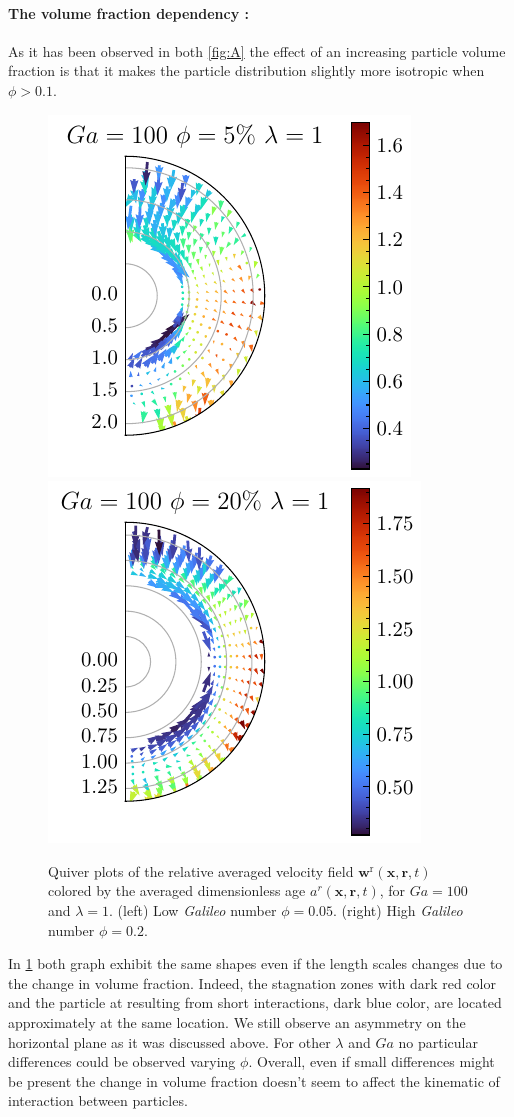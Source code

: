 \paragraph*{The volume fraction dependency :}
As it has been observed in both \ref{fig:A} the effect of an increasing particle volume fraction is that it makes the particle distribution slightly more isotropic when $\phi >0.1$. 
\begin{figure}[h!]
    \centering
    \includegraphics[height=0.35\textwidth]{image/HOMOGENEOUS_NEW/Dist/U_rel_l_1_Ga_100_PHI_5.pdf}
    \includegraphics[height=0.35\textwidth]{image/HOMOGENEOUS_NEW/Dist/U_rel_l_1_Ga_100_PHI_20.pdf}
    \caption{Quiver plots of the relative averaged velocity field $\textbf{w}^\text{r}(\textbf{x},\textbf{r},t)$ colored by the averaged dimensionless age $a^r(\textbf{x},\textbf{r},t)$, for $Ga = 100$ and $\lambda = 1$. 
    (left) Low \textit{Galileo} number $\phi = 0.05$.
    (right) High \textit{Galileo} number $\phi = 0.2$. }
    \label{fig:Why_Phi_matter}
\end{figure}
In \ref{fig:Why_Phi_matter} both graph exhibit the same shapes even if the length scales changes due to the change in volume fraction. 
Indeed, the stagnation zones with dark red color and the particle at resulting from short interactions, dark blue color, are located approximately at the same location. 
We still observe an asymmetry on the horizontal plane as it was discussed above. 
For other $\lambda$ and $Ga$ no particular differences could be observed varying $\phi$. 
Overall, even if small differences might be present the change in volume fraction doesn't seem to affect the kinematic of interaction between particles. 

